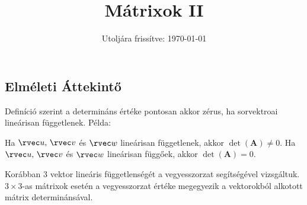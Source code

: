 \documentclass[a4paper, 12pt]{scrartcl}
\title{Mátrixok II}
\date{Utoljára frissítve: \today}
\begin{document}
\maketitle
\subsection{Elméleti Áttekintő}

\begin{definition}
  Definíció szerint a determináns értéke pontosan akkor zérus, ha sorvektroai lineárisan függetlenek. Példa:
  \begin{center}
  \end{center}
  Ha $\rvec u,\, \rvec v$ és $\rvec w$ lineárisan függetlenek, akkor $\det(\textbf{A})\neq 0$. Ha $\rvec u,\, \rvec v$ és $\rvec w$ lineárisan függőek, akkor $\det(\textbf{A})=0$.
\end{definition}

\begin{note}
  Korábban 3 vektor lineáris függetlenségét a vegyesszorzat segítségével
  vizsgáltuk. $3 \times 3$-as mátrixok esetén a vegyesszorzat értéke megegyezik
  a vektorokból alkotott mátrix determinánsával.
\end{note}
\end{document}
